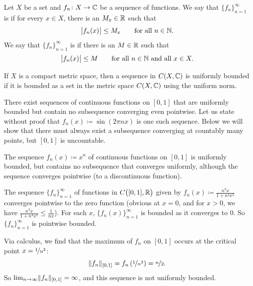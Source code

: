 \begin{defn}
Let $X$ be a set and
$f_n \colon X \to {\mathbb{C}}$ be a sequence of functions.  We say that
$\{ f_n \}_{n=1}^\infty$
is \emph{} if for every $x \in X$, there is an $M_x \in {\mathbb{R}}$
such that
\begin{equation*}
\bigl\lvert {f_n(x)} \bigr\rvert \leq M_x \qquad \text{for all } n \in {\mathbb{N}} .
\end{equation*}
We say that
$\{ f_n \}_{n=1}^\infty$
is \emph{} if there is an $M \in {\mathbb{R}}$
such that
\begin{equation*}
\bigl\lvert {f_n(x)} \bigr\rvert \leq M \qquad \text{for all } n \in {\mathbb{N}} \text{ and all } x \in X.
\end{equation*}
\end{defn}

If $X$ is a compact metric space, then a sequence in $C(X,{\mathbb{C}})$
is uniformly bounded if it is bounded as a set in the metric space
$C(X,{\mathbb{C}})$ using the uniform norm.

\begin{example}
There exist sequences of 
continuous functions
on $[0,1]$ that are uniformly bounded but contain no subsequence converging
even pointwise.
Let us state without proof that $f_n(x) \coloneqq \sin (2\pi n x)$ is one
such sequence.
Below we will show that there must always exist
a subsequence converging at countably
many points, but $[0,1]$ is uncountable.
\end{example}

\begin{example}
The sequence $f_n(x) \coloneqq x^n$ of continuous functions on $[0,1]$
is uniformly bounded, but contains no subsequence that converges
uniformly,
although the sequence converges pointwise (to a discontinuous function).
\end{example}

\begin{example}
The sequence $\{ f_n \}_{n=1}^\infty$ of functions in $C\bigl([0,1],{\mathbb{R}}\bigr)$ given by
$f_n(x) \coloneqq \frac{n^3x}{1+n^4x^2}$
converges pointwise to the zero function (obvious at $x=0$, and for $x > 0$,
we have $\frac{n^3x}{1+n^4x^2} \leq \frac{1}{nx}$).
For each $x$, $\{f_n(x)\}_{n=1}^\infty$ is bounded as it converges to 0.
So $\{ f_n \}_{n=1}^\infty$ is pointwise bounded.

Via calculus, we find that the maximum of
$f_n$ on
$[0,1]$ occurs at the critical point
$x=\nicefrac{1}{n^2}$:
\begin{equation*}
\lVert {f_n} \rVert_{[0,1]}
=
f_n\left(\nicefrac{1}{n^2}\right)
= \nicefrac{n}{2} .
\end{equation*}
So $\lim_{n\to\infty} \lVert {f_n} \rVert_{[0,1]} = \infty$, and
this sequence is not uniformly bounded.
\end{example}

